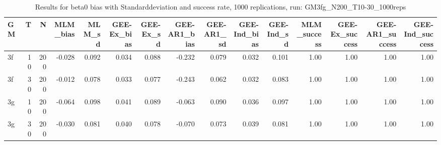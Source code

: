 \begin{table}[ht]
\centering
\begin{tabular}{lrrrrrrrrrrrrrr}
  \hline
GM & T & N & MLM\_bias & MLM\_sd & GEE-Ex\_bias & GEE-Ex\_sd & GEE-AR1\_bias & GEE-AR1\_sd & GEE-Ind\_bias & GEE-Ind\_sd & MLM\_success & GEE-Ex\_success & GEE-AR1\_success & GEE-Ind\_success \\ 
  \hline
3f & 10 & 200 & -0.028 & 0.092 & 0.034 & 0.088 & -0.232 & 0.079 & 0.032 & 0.101 & 1.00 & 1.00 & 1.00 & 1.00 \\ 
  3f & 30 & 200 & -0.012 & 0.078 & 0.033 & 0.077 & -0.243 & 0.062 & 0.032 & 0.083 & 1.00 & 1.00 & 1.00 & 1.00 \\ 
  3g & 10 & 200 & -0.064 & 0.098 & 0.041 & 0.089 & -0.063 & 0.090 & 0.036 & 0.097 & 1.00 & 1.00 & 1.00 & 1.00 \\ 
  3g & 30 & 200 & -0.030 & 0.081 & 0.040 & 0.078 & -0.070 & 0.073 & 0.039 & 0.081 & 1.00 & 1.00 & 1.00 & 1.00 \\ 
   \hline
\end{tabular}
\caption{Results for beta0 bias with Standarddeviation and success rate, 1000 replications, run: GM3fg_N200_T10-30_1000reps} 
\label{tab:beta0_bias_sd_success}
\end{table}
